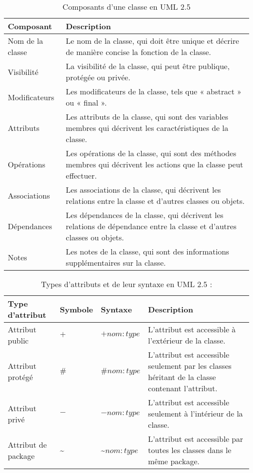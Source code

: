 \begin{table}[h]
\caption{Composants d'une classe en UML 2.5}
\label{tbl:diagram_class_classecomponents}
\begin{adjustbox}{max width=\textwidth}
\begin{tabular}{l|l}
\toprule
\textbf{Composant} & \textbf{Description} \\
\midrule
Nom de la classe & Le nom de la classe, qui doit être unique et décrire de manière concise la fonction de la classe. \\
Visibilité & La visibilité de la classe, qui peut être publique, protégée ou privée. \\
Modificateurs & Les modificateurs de la classe, tels que « abstract » ou « final ». \\
Attributs & Les attributs de la classe, qui sont des variables membres qui décrivent les caractéristiques de la classe. \\
Opérations & Les opérations de la classe, qui sont des méthodes membres qui décrivent les actions que la classe peut effectuer. \\
Associations & Les associations de la classe, qui décrivent les relations entre la classe et d'autres classes ou objets. \\
Dépendances & Les dépendances de la classe, qui décrivent les relations de dépendance entre la classe et d'autres classes ou objets. \\
Notes & Les notes de la classe, qui sont des informations supplémentaires sur la classe. \\
\bottomrule
\end{tabular}
\end{adjustbox}
\end{table}


\begin{table}[H]
\caption{Types d'attributs et de leur syntaxe en UML 2.5 :}
\label{tbl:diagram_class_classeattributs}
\begin{adjustbox}{max width=\textwidth}
\begin{tabular}{p{3cm}|p{2cm}|p{2cm}|l}
\toprule
\textbf{Type d'attribut} & \textbf{Symbole} & \textbf{Syntaxe} & \textbf{Description} \\
\midrule
Attribut public & $+$ & $+nom: type$ & L'attribut est accessible à l'extérieur de la classe. \\
Attribut protégé & $\#$ & $\#nom: type$ & L'attribut est accessible seulement par les classes héritant de la classe contenant l'attribut. \\
Attribut privé & $-$ & $-nom: type$ & L'attribut est accessible seulement à l'intérieur de la classe. \\
Attribut de package & \textasciitilde & \textasciitilde $nom: type$ & L'attribut est accessible par toutes les classes dans le même package. \\
\bottomrule
\end{tabular}
\end{adjustbox}
\end{table}


